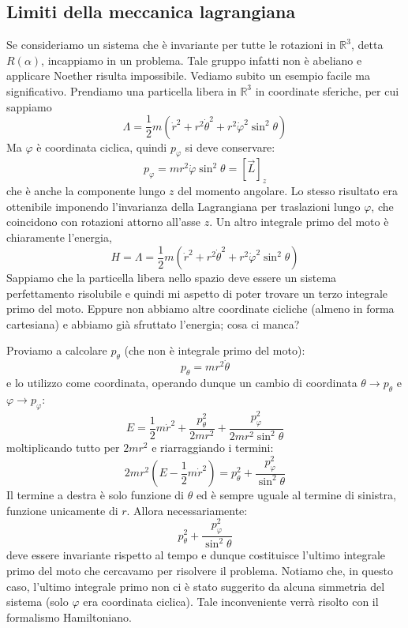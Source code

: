\documentclass[a4paper,openany]{article}
\begin{document}
	\subsection{Limiti della meccanica lagrangiana}
	Se consideriamo un sistema che è invariante per tutte le rotazioni in $\mathbb{R}^{3}$, detta $R(\alpha)$, incappiamo in un problema. Tale gruppo infatti non è abeliano e applicare Noether risulta impossibile. Vediamo subito un esempio facile ma significativo. Prendiamo una particella libera in $\mathbb{R}^{3}$ in coordinate sferiche, per cui sappiamo
	\begin{equation}\label{key}
		\Lambda = \dfrac{1}{2}m(\dot{r}^2+r^2\dot{\theta}^2+r^2\dot{\varphi}^2\sin^2\theta)
	\end{equation}
	Ma $\varphi$ è coordinata ciclica, quindi $p_\varphi$ si deve conservare:
	\begin{equation}\label{key}
		p_\varphi = mr^2\dot{\varphi}\sin^2\theta = [ \vec{L}]_z
	\end{equation}
	che è anche la componente lungo $z$ del momento angolare. Lo stesso risultato era ottenibile imponendo l'invarianza della Lagrangiana per traslazioni lungo $\varphi$, che coincidono con rotazioni attorno all'asse $z$. Un altro integrale primo del moto è chiaramente l'energia,
	\begin{equation}\label{key}
		H = \Lambda = \dfrac{1}{2}m(\dot{r}^2+r^2\dot{\theta}^2+r^2\dot{\varphi}^2\sin^2\theta)
	\end{equation}
	Sappiamo che la particella libera nello spazio deve essere un sistema perfettamento risolubile e quindi mi aspetto di poter trovare un terzo integrale primo del moto. Eppure non abbiamo altre coordinate cicliche (almeno in forma cartesiana) e abbiamo già sfruttato l'energia; cosa ci manca? 
	
	Proviamo a calcolare $p_\theta$ (che non è integrale primo del moto):
	\begin{equation}\label{key}
		p_{\theta} = mr^2\dot{\theta} 
	\end{equation}
	e lo utilizzo come coordinata, operando dunque un cambio di coordinata $\theta \rightarrow p_\theta$ e $\varphi \rightarrow p_\varphi$:
	\begin{equation}\label{key}
		E = \dfrac{1}{2}m\dot{r}^2 + \dfrac{p_{\theta}^{2}}{2mr^{2}} + \dfrac{p_{\varphi}^2}{2mr^2\sin^2\theta}
	\end{equation}
	moltiplicando tutto per $2mr^{2}$ e riarraggiando i termini:
	\begin{equation}\label{key}
		2mr^2 (E - \dfrac{1}{2}m\dot{r}^2)  =  p_{\theta}^{2} + \dfrac{p_{\varphi}^2}{\sin^2\theta}
	\end{equation}
	Il termine a destra è solo funzione di $\theta$ ed è sempre uguale al termine di sinistra, funzione unicamente di $r$. Allora necessariamente:
	$$
	p_{\theta}^{2} + \dfrac{p_{\varphi}^2}{\sin^2\theta}
	$$
	deve essere invariante rispetto al tempo e dunque costituisce l'ultimo integrale primo del moto che cercavamo per risolvere il problema. Notiamo che, in questo caso, l'ultimo integrale primo non ci è stato suggerito da alcuna simmetria del sistema (solo $\varphi$ era coordinata ciclica). Tale inconveniente verrà risolto con il formalismo Hamiltoniano.
	
\end{document}

